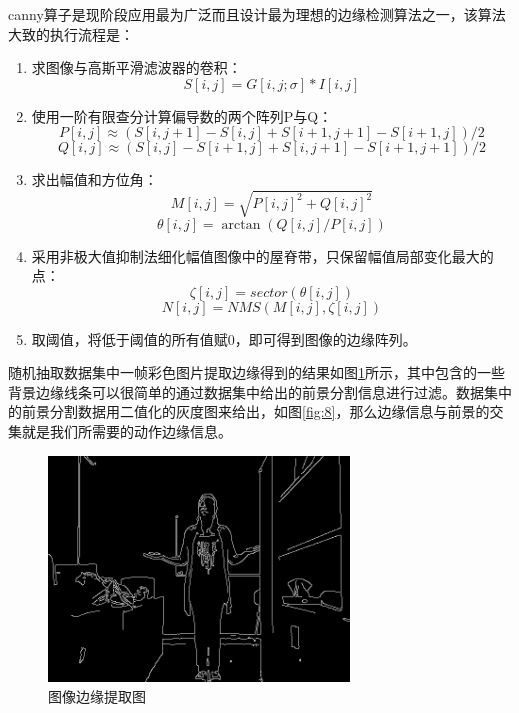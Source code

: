\documentclass[a4paper, 12pt]{article}
\begin{document}
canny算子是现阶段应用最为广泛而且设计最为理想的边缘检测算法之一\cite{p6}，该算法大致的执行流程是：
\begin{enumerate}
\item 求图像与高斯平滑滤波器的卷积：
\begin{equation}
  S[i,j] = G[i,j;\sigma]*I[i,j]
\end{equation}
\item 使用一阶有限查分计算偏导数的两个阵列P与Q：
\begin{equation}
  P[i,j]\approx (S[i,j+1]-S[i,j]+S[i+1,j+1]-S[i+1,j])/2
\end{equation}
\begin{equation}
  Q[i,j]\approx (S[i,j]-S[i+1,j]+S[i,j+1]-S[i+1,j+1])/2
\end{equation}
\item 求出幅值和方位角：
\begin{equation}
  M[i,j] = \sqrt{P[i,j]^2+Q[i,j]^2}
\end{equation}
\begin{equation}
  \theta[i,j] = \arctan(Q[i,j]/P[i,j])
\end{equation}
\item 采用非极大值抑制法细化幅值图像中的屋脊带，只保留幅值局部变化最大的点：
\begin{equation}
  \zeta[i,j] = sector(\theta[i,j])
\end{equation}
\begin{equation}
  N[i,j] = NMS(M[i,j],\zeta[i,j])
\end{equation}
\item 取阈值，将低于阈值的所有值赋0，即可得到图像的边缘阵列。
\end{enumerate}

随机抽取数据集中一帧彩色图片提取边缘得到的结果如图\ref{fig:6}所示，其中包含的一些背景边缘线条可以很简单的通过数据集中给出的前景分割信息进行过滤。数据集中的前景分割数据用二值化的灰度图来给出，如图\ref{fig:8}，那么边缘信息与前景的交集就是我们所需要的动作边缘信息。
\begin{figure}[ht]
  \centering
  \label{fig:6}
  \includegraphics[width=8cm]{canny.jpg}
  \caption{图像边缘提取图\label{fig:6}}
\end{figure}
\end{document}
